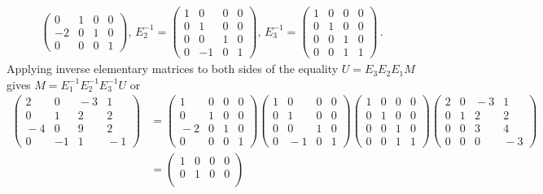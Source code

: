 \begin{example}
\begin{gather*}
\begin{pmatrix}
0&1&0&0\\
-2&0&1&0\\
0&0&0&1
\end{pmatrix}  , \,
E_2^{-1}=
\begin{pmatrix}
1&0&0&0\\
0&1&0&0\\
0&0&1&0\\
0&-1&0&1
\end{pmatrix}  , \,
E_3^{-1}=
\begin{pmatrix}
1&0&0&0\\
0&1&0&0\\
0&0&1&0\\
0&0&1&1
\end{pmatrix} \, .
\end{gather*}
Applying inverse elementary matrices to both sides of the equality  $U=E_3E_2E_1M$ gives 
$M=E_1^{-1}E_2^{-1}E_3^{-1}U$ or 
\begin{align*}
\begin{pmatrix}
2&0&\!\!-3&1\\
0&1&2&2\\
\!-4&0&9&2\\
0&-1&1&\!\!-1
\end{pmatrix}
\!\!\!\!\!\!&=
\begin{pmatrix}
1&0&0&0\\
0&1&0&0\\
\!-2&0&1&0\\
0&0&0&1
\end{pmatrix} \!\!\!
\begin{pmatrix}
1&0&0&0\\
0&1&0&0\\
0&0&1&0\\
0&\!\!\!-1&0&1
\end{pmatrix}\!\!\!
\begin{pmatrix}
1&0&0&0\\
0&1&0&0\\
0&0&1&0\\
0&0&1&1
\end{pmatrix}\!\!\!
\begin{pmatrix}
2&0&\!\!\!-3&1\\
0&1&2&2\\
0&0&3&4\\
0&0&0&\!\!-3
\end{pmatrix}
\\[2mm]
&=
\begin{pmatrix}
1&0&0&0\\
0&1&0&0\\

\end{pmatrix}
\end{align*}
\end{example}
